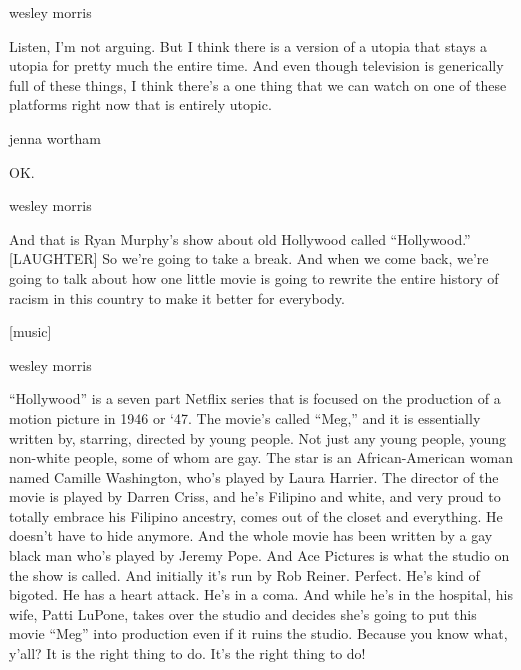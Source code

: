 wesley morris

Listen, I'm not arguing. But I think there is a version of a utopia that
stays a utopia for pretty much the entire time. And even though
television is generically full of these things, I think there's a one
thing that we can watch on one of these platforms right now that is
entirely utopic.

jenna wortham

OK.

wesley morris

And that is Ryan Murphy's show about old Hollywood called ``Hollywood.''
{[}LAUGHTER{]} So we're going to take a break. And when we come back,
we're going to talk about how one little movie is going to rewrite the
entire history of racism in this country to make it better for
everybody.

{[}music{]}

wesley morris

``Hollywood'' is a seven part Netflix series that is focused on the
production of a motion picture in 1946 or `47. The movie's called
``Meg,'' and it is essentially written by, starring, directed by young
people. Not just any young people, young non-white people, some of whom
are gay. The star is an African-American woman named Camille Washington,
who's played by Laura Harrier. The director of the movie is played by
Darren Criss, and he's Filipino and white, and very proud to totally
embrace his Filipino ancestry, comes out of the closet and everything.
He doesn't have to hide anymore. And the whole movie has been written by
a gay black man who's played by Jeremy Pope. And Ace Pictures is what
the studio on the show is called. And initially it's run by Rob Reiner.
Perfect. He's kind of bigoted. He has a heart attack. He's in a coma.
And while he's in the hospital, his wife, Patti LuPone, takes over the
studio and decides she's going to put this movie ``Meg'' into production
even if it ruins the studio. Because you know what, y'all? It is the
right thing to do. It's the right thing to do!

